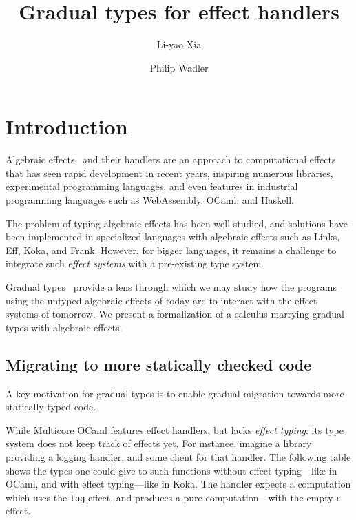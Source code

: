 \documentclass[\ClassReview acmsmall,screen,prologue,dvipsnames,style=authoryear,anonymous]{acmart}
\author[L. Xia]{Li-yao Xia}
\affiliation{
  \institution{University of Edinburgh}
  \city{Edinburgh}\country{United Kingdom}
}
\author[P. Wadler]{Philip Wadler}
\affiliation{
  \institution{University of Edinburgh}
  \city{Edinburgh}\country{United Kingdom}
}
\title{Gradual types for effect handlers}
\begin{document}
\maketitle

\section{Introduction}

Algebraic effects~\citep{plotkin2001semantics} and their handlers are an
approach to computational effects that has seen rapid development in recent
years, inspiring numerous libraries, experimental programming languages,
and even features in industrial programming languages such as WebAssembly, OCaml,
and Haskell.

The problem of typing algebraic effects has been well studied, and solutions
have been implemented in specialized languages with algebraic effects such as
Links, Eff, Koka, and Frank. However, for bigger languages, it remains a
challenge to integrate such \emph{effect systems} with a pre-existing type
system.

Gradual types~\citep{siek2015} provide a lens through which we may study how
the programs using the untyped algebraic effects of today are to interact with
the effect systems of tomorrow. We present a formalization of a
calculus marrying gradual types with algebraic effects.

\subsection{Migrating to more statically checked code}

\def\dhandler{\texttt{loghandler}_\texttt{untyped}}
\def\shandler{\texttt{loghandler}_\texttt{typed}}
\def\dclient{\texttt{client}_\texttt{untyped}}
\def\sclient{\texttt{client}_\texttt{typed}}

A key motivation for gradual types is to enable gradual migration
towards more statically typed code.

While Multicore OCaml features effect handlers, but lacks \emph{effect typing}:
its type system does not keep track of effects yet.
For instance, imagine a library providing a logging
handler, and some client for that handler.
The following table shows the types one could give to such functions without
effect typing---like in OCaml, and with effect typing---like in Koka.
The handler expects a computation which uses the \texttt{log} effect, and
produces a pure computation---with the empty \texttt{ε} effect.
\end{document}
